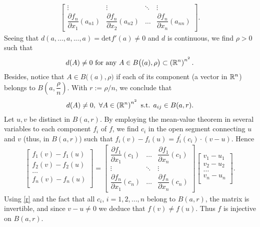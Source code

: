 \begin{problem}
\begin{solution}
\begin{enumerate}
\begin{align*}
\begin{bmatrix}
            \vdots & \vdots & \ddots & \vdots \\
            \dfrac{\partial f_n}{\partial x_1}(a_{n1}) & \dfrac{\partial f_n}{\partial x_2}(a_{n2}) & \dots & \dfrac{\partial f_n}{\partial x_n}(a_{nn}) 
            \end{bmatrix}.
    \end{align*}
     Seeing that $d(a,...,a,...,a) = \mathrm{det}f'(a) \ne 0$ and $d$ is continuous, we find $\rho >0$ such that 
     \begin{align*}
        d(A) \ne 0 \text{ for any } A \in B\big( (a), \rho \big) \subset \left( \mathbb{R}^n \right)^{n^2}.
     \end{align*}
    Besides, notice that $A \in B\big( (a) , \rho \big)$ if each of its component (a vector in $\mathbb{R}^n$) belongs to $B\left( a, \dfrac{\rho}{n}\right)$. With $r:=\rho /n$, we conclude that 
    \begin{align}\label{r}
        d(A)\ne 0,\ \forall A\in \left(\mathbb{R}^n\right)^{n^2} \text{ s.t. } a_{ij} \in B(a,r).    
    \end{align}
    Let $u,v$ be distinct in $B(a,r)$. By employing the mean-value theorem in several variables to each component $f_i$ of $f$, we find $c_i$ in the open segment connecting $u$ and $v$ (thus, in $B(a,r)$) such that $f_i (v) - f_i (u) = f_i^{'}(c_i) \cdot (v-u)$. Hence
    \begin{align*}
        \begin{bmatrix}
           f_1 (v) - f_1 (u) \\
           f_2 (v) - f_2 (u) \\
           \dots \\
           f_n (v) - f_n (u) \\
        \end{bmatrix}
        =
        \begin{bmatrix}
            \dfrac{\partial f_1}{\partial x_1}(c_1) & \dots & \dfrac{\partial f_1}{\partial x_n}(c_1) \\
            \vdots & \ddots & \vdots \\
            \dfrac{\partial f_n}{\partial x_1}(c_n) & \dots & \dfrac{\partial f_n}{\partial x_n}(c_n)
        \end{bmatrix}
        \begin{bmatrix}
           v_1 - u_1 \\
           v_2 - u_2 \\
           \dots \\
           v_n - u_n \\
        \end{bmatrix}.
    \end{align*}
    Using \eqref{r} and the fact that all $c_i$, $i=1,2,...,n$ belong to $B(a,r)$, the matrix is invertible, and since $v-u\neq 0$ we deduce that $f(v)\ne f(u)$. Thus $f$ is injective on $B(a,r)$.    \\
    

\end{enumerate}
\end{solution}
\end{problem}
